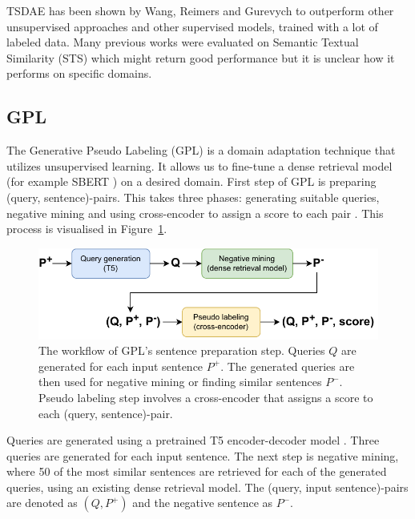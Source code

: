 \documentclass[fleqn,moreauthors,10pt]{ds_report}
\begin{document}
TSDAE has been shown by Wang, Reimers and Gurevych \cite{wang-etal-2021-tsdae-using} to outperform other unsupervised approaches and other supervised models, trained with a lot of labeled data. Many previous works were evaluated on Semantic Textual Similarity (STS) which might return good performance but it is unclear how it performs on specific domains. 


\subsection*{GPL}

The Generative Pseudo Labeling (GPL) is a domain adaptation technique that utilizes unsupervised learning. It allows us to fine-tune a dense retrieval model (for example SBERT \cite{SBERT}) on a desired domain. First step of GPL is preparing (query, sentence)-pairs. This takes three phases: generating suitable queries, negative mining and using cross-encoder to assign a score to each pair \cite{GPL}. This process is visualised in Figure~\ref{fig:GPL}.

\begin{figure}[ht]\centering
	\vspace{12 pt}
	\includegraphics[width=\linewidth]{GPL_data_preprocessing.pdf}
	\vspace{5 pt}
	\caption{The workflow of GPL's sentence preparation step. Queries $Q$ are generated for each input sentence $P^{+}$. The generated queries are then used for negative mining or finding similar sentences $P^{-}$. Pseudo labeling step involves a cross-encoder that assigns a score to each (query, sentence)-pair.}
	\label{fig:GPL}
\end{figure}

Queries are generated using a pretrained T5 encoder-decoder model \cite{T5}. Three queries are generated for each input sentence. The next step is negative mining, where 50 of the most similar sentences are retrieved for each of the generated queries, using an existing dense retrieval model. The (query, input sentence)-pairs are denoted as $(Q, P^{+})$ and the negative sentence as $P^{-}$.
\end{document}
